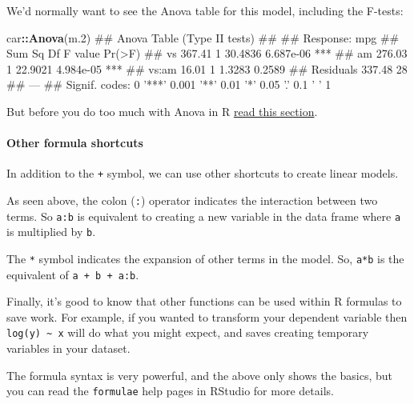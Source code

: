 \documentclass[]{article}
\newenvironment{Shaded}{\begin{snugshade}}{\end{snugshade}}
\newcommand{\KeywordTok}[1]{\textcolor[rgb]{0.13,0.29,0.53}{\textbf{#1}}}
\newcommand{\DecValTok}[1]{\textcolor[rgb]{0.00,0.00,0.81}{#1}}
\newcommand{\OperatorTok}[1]{\textcolor[rgb]{0.81,0.36,0.00}{\textbf{#1}}}
\newcommand{\NormalTok}[1]{#1}
\let\oldparagraph\paragraph
\renewcommand{\paragraph}[1]{\oldparagraph{#1}\mbox{}}
\let\oldsubparagraph\subparagraph
\renewcommand{\subparagraph}[1]{\oldsubparagraph{#1}\mbox{}}
\theoremstyle{definition}
\theoremstyle{definition}
\theoremstyle{definition}
\theoremstyle{remark}
\begin{document}
We'd normally want to see the Anova table for this model, including the
F-tests:

\begin{Shaded}
\begin{Highlighting}[]
\NormalTok{car}\OperatorTok{::}\KeywordTok{Anova}\NormalTok{(m.}\DecValTok{2}\NormalTok{)}
\NormalTok{## Anova Table (Type II tests)}
\NormalTok{## }
\NormalTok{## Response: mpg}
\NormalTok{##           Sum Sq Df F value    Pr(>F)    }
\NormalTok{## vs        367.41  1 30.4836 6.687e-06 ***}
\NormalTok{## am        276.03  1 22.9021 4.984e-05 ***}
\NormalTok{## vs:am      16.01  1  1.3283    0.2589    }
\NormalTok{## Residuals 337.48 28                      }
\NormalTok{## ---}
\NormalTok{## Signif. codes:  0 '***' 0.001 '**' 0.01 '*' 0.05 '.' 0.1 ' ' 1}
\end{Highlighting}
\end{Shaded}

But before you do too much with Anova in R \href{anova.html}{read this
section}.

\paragraph{Other formula shortcuts}\label{other-formula-shortcuts}

In addition to the \texttt{+} symbol, we can use other shortcuts to
create linear models.

As seen above, the colon (\texttt{:}) operator indicates the interaction
between two terms. So \texttt{a:b} is equivalent to creating a new
variable in the data frame where \texttt{a} is multiplied by \texttt{b}.

The \texttt{*} symbol indicates the expansion of other terms in the
model. So, \texttt{a*b} is the equivalent of \texttt{a\ +\ b\ +\ a:b}.

Finally, it's good to know that other functions can be used within R
formulas to save work. For example, if you wanted to transform your
dependent variable then \texttt{log(y)\ \textasciitilde{}\ x} will do
what you might expect, and saves creating temporary variables in your
dataset.

The formula syntax is very powerful, and the above only shows the
basics, but you can read the \texttt{formulae} help pages in RStudio for
more details.

\subparagraph{}\label{section-14}
\end{document}
